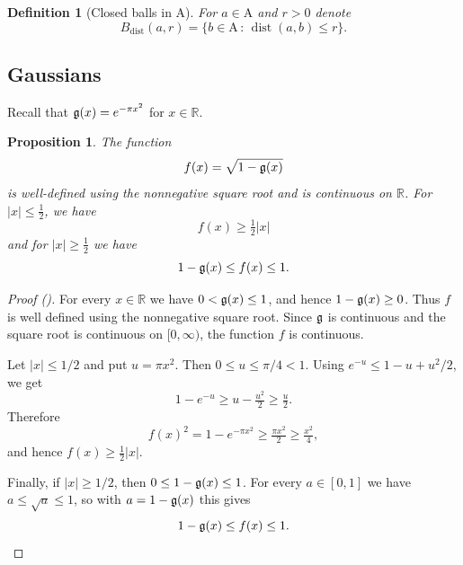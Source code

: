 \documentclass[12pt,reqno]{amsart}
\newcommand{\auto}{{({\tiny\faCar})}}
\theoremstyle{plain}
\newtheorem{proposition}[theorem]{Proposition}
\newtheorem{definition}[theorem]{Definition}
\numberwithin{equation}{section}
\theoremstyle{remark}
\newcommand{\R}{{\mathbb R}}
\DeclareMathOperator{\dist}{dist}
\begin{document}
\begin{definition}[Closed balls in $\mathrm{A}$]\label{closed balls in A}
For $a\in\mathrm{A}$ and $r>0$ denote
\begin{equation}\label{auto:spaced-sequence-distance-ball}B_{\mathrm{dist}}(a,r)=\{b\in\mathrm{A}\,:\,\dist(a,b)\le r\}.\end{equation}
\end{definition}

\subsection{Gaussians}

Recall that $\mathfrak{g}(x)=e^{-\pi x^2}$ for $x\in\R$.

\begin{proposition}\label{square root one minus Gaussian}
    The function
    \begin{equation}\label{auto:square-root-one-minus-Gaussian}
        f(x)=\sqrt{1-\mathfrak{g}(x)}
    \end{equation}
    is well-defined
    using the nonnegative square root and is continuous on $\R$.
    For $|x|\le \frac 12$, we have
    \begin{equation}\label{auto:square-root-one-minus-Gaussian-small-lower-bound}
        f(x)\ge \tfrac 12 |x|
    \end{equation}
    and for $|x|\ge \frac 12$ we have
 \begin{equation}\label{auto:square-root-one-minus-Gaussian-large-bounds}
        1-\mathfrak{g}(x)\le f(x)\le 1.
    \end{equation}
\end{proposition}
\begin{proof}[Proof \auto]
For every $x\in\R$ we have $0<\mathfrak{g}(x)\le 1$, and hence
$1-\mathfrak{g}(x)\ge 0$. Thus $f$ is well defined using the nonnegative square
root. Since $\mathfrak{g}$ is continuous and the square root is continuous on
$[0,\infty)$, the function $f$ is continuous.

Let $|x|\le 1/2$ and put $u=\pi x^2$. Then $0\le u\le \pi/4<1$. Using
$e^{-u}\le 1-u+u^2/2$, we get
\[
1-e^{-u}\ge u-\tfrac{u^2}{2}\ge \tfrac u2 .
\]
Therefore
\[
f(x)^2=1-e^{-\pi x^2}\ge \tfrac{\pi x^2}{2}\ge \tfrac{x^2}{4},
\]
and hence $f(x)\ge \frac12 |x|$.

Finally, if $|x|\ge 1/2$, then $0\le 1-\mathfrak{g}(x)\le 1$. For every
$a\in[0,1]$ we have $a\le \sqrt a\le 1$, so with $a=1-\mathfrak{g}(x)$ this gives
\[
1-\mathfrak{g}(x)\le f(x)\le 1 .
\]
\end{proof}
\end{document}
